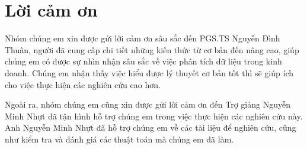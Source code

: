 \section*{Lời cảm ơn}
Nhóm chúng em xin được gửi lời cảm ơn sâu sắc đến PGS.TS Nguyễn Đình Thuân, người đã cung cấp chi tiết những kiến thức từ cơ bản đến nâng cao, giúp chúng em có được sự nhìn nhận sâu sắc về việc phân tích dữ liệu trong kinh doanh. Chúng em nhận thấy việc hiểu được lý thuyết cơ bản tốt thì sẽ giúp ích cho việc thực hiện các nghiên cứu cao hơn.

Ngoài ra, nhóm chúng em cũng xin được gửi lời cảm ơn đến Trợ giảng Nguyễn Minh Nhựt đã tận hình hỗ trợ chúng em trong việc thực hiện các nghiên cứu này. Anh Nguyễn Minh Nhựt đã hỗ trợ chúng em về các tài liệu để nghiên cứu, cũng như kiểm tra và đánh giá các thuật toán mà chúng em đã làm.
